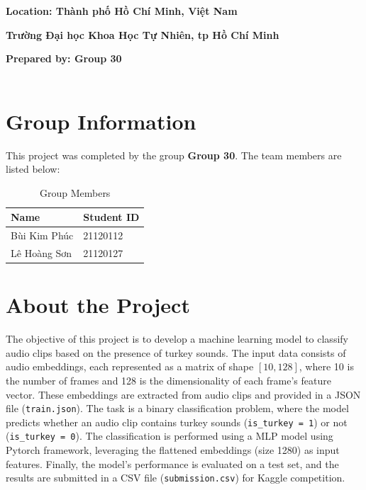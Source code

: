 \documentclass[12pt, a4paper]{article}
\begin{document}
\begin{titlepage}
    \large \textbf{Location: Thành phố Hồ Chí Minh, Việt Nam} \\

    \vspace{0.5cm}
    
    \large \textbf{Trường Đại học Khoa Học Tự Nhiên, tp Hồ Chí Minh} \\
    
    \vspace{1cm}
    
    \large \textbf{Prepared by: Group 30} \\

    \small {} \\
    
    \vfill
    
\end{titlepage}

\newpage

\section{Group Information}
This project was completed by the group \textbf{Group 30}. The team members are listed below:

\begin{table}[h]
    \centering
    \begin{tabular}{ll}
        \toprule
        \textbf{Name} & \textbf{Student ID} \\
        \midrule
        Bùi Kim Phúc & 21120112 \\
        Lê Hoàng Sơn & 21120127 \\
        \bottomrule
    \end{tabular}
    \caption{Group Members}
    \label{tab:group_members}
\end{table}

\section{About the Project}
The objective of this project is to develop a machine learning model to classify audio clips based on the presence of turkey sounds. The input data consists of audio embeddings, each represented as a matrix of shape $[10, 128]$, where 10 is the number of frames and 128 is the dimensionality of each frame’s feature vector. These embeddings are extracted from audio clips and provided in a JSON file (\texttt{train.json}). The task is a binary classification problem, where the model predicts whether an audio clip contains turkey sounds (\texttt{is\_turkey = 1}) or not (\texttt{is\_turkey = 0}). The classification is performed using a MLP model using Pytorch framework, leveraging the flattened embeddings (size 1280) as input features.
Finally, the model's performance is evaluated on a test set, and the results are submitted in a CSV file (\texttt{submission.csv}) for Kaggle competition.
\end{document}
